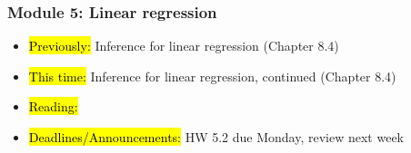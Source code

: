 
\begin{frame}
    \frametitle{Module 5: Linear regression}
    \begin{itemize}
        \item \hl{Previously: }Inference for linear regression (Chapter 8.4)
        \item \hl{This time: }Inference for linear regression, continued (Chapter 8.4)
        \item \hl{Reading: }
        \item \hl{Deadlines/Announcements: }HW 5.2 due Monday, review next week
    \end{itemize}
    
\end{frame}